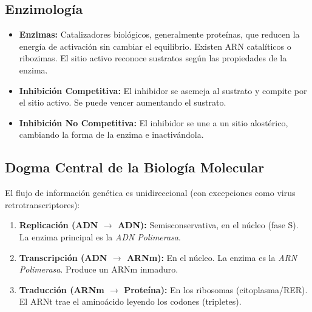 \subsection{Enzimología}
\begin{itemize}
    \item \textbf{Enzimas:} Catalizadores biológicos, generalmente proteínas, que reducen la energía de activación sin cambiar el equilibrio. Existen ARN catalíticos o ribozimas. El sitio activo reconoce sustratos según las propiedades de la enzima.
    \item \textbf{Inhibición Competitiva:} El inhibidor se asemeja al sustrato y compite por el sitio activo. Se puede vencer aumentando el sustrato.
    \item \textbf{Inhibición No Competitiva:} El inhibidor se une a un sitio alostérico, cambiando la forma de la enzima e inactivándola.
\end{itemize}

\subsection{Dogma Central de la Biología Molecular}
El flujo de información genética es unidireccional (con excepciones como virus retrotranscriptores):
\begin{enumerate}
    \item \textbf{Replicación (ADN $\rightarrow$ ADN):} Semisconservativa, en el núcleo (fase S). La enzima principal es la \textit{ADN Polimerasa}.
    \item \textbf{Transcripción (ADN $\rightarrow$ ARNm):} En el núcleo. La enzima es la \textit{ARN Polimerasa}. Produce un ARNm inmaduro.
    \item \textbf{Traducción (ARNm $\rightarrow$ Proteína):} En los ribosomas (citoplasma/RER). El ARNt trae el aminoácido leyendo los codones (tripletes).
\end{enumerate}

\newpage
